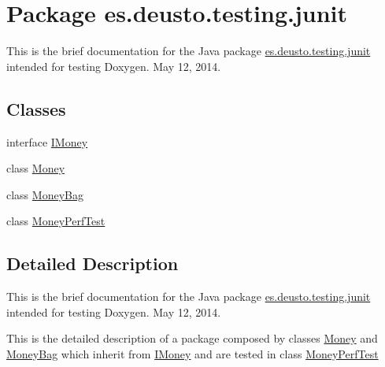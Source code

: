 \hypertarget{namespacees_1_1deusto_1_1testing_1_1junit}{}\section{Package es.\+deusto.\+testing.\+junit}
\label{namespacees_1_1deusto_1_1testing_1_1junit}


This is the brief documentation for the Java package \mbox{\hyperlink{namespacees_1_1deusto_1_1testing_1_1junit}{es.\+deusto.\+testing.\+junit}} intended for testing Doxygen. May 12, 2014.  


\subsection*{Classes}
\begin{DoxyCompactItemize}
\item 
interface \mbox{\hyperlink{interfacees_1_1deusto_1_1testing_1_1junit_1_1_i_money}{I\+Money}}
\item 
class \mbox{\hyperlink{classes_1_1deusto_1_1testing_1_1junit_1_1_money}{Money}}
\item 
class \mbox{\hyperlink{classes_1_1deusto_1_1testing_1_1junit_1_1_money_bag}{Money\+Bag}}
\item 
class \mbox{\hyperlink{classes_1_1deusto_1_1testing_1_1junit_1_1_money_perf_test}{Money\+Perf\+Test}}
\end{DoxyCompactItemize}


\subsection{Detailed Description}
This is the brief documentation for the Java package \mbox{\hyperlink{namespacees_1_1deusto_1_1testing_1_1junit}{es.\+deusto.\+testing.\+junit}} intended for testing Doxygen. May 12, 2014. 

This is the detailed description of a package composed by classes \mbox{\hyperlink{classes_1_1deusto_1_1testing_1_1junit_1_1_money}{Money}} and \mbox{\hyperlink{classes_1_1deusto_1_1testing_1_1junit_1_1_money_bag}{Money\+Bag}} which inherit from \mbox{\hyperlink{interfacees_1_1deusto_1_1testing_1_1junit_1_1_i_money}{I\+Money}} and are tested in class \mbox{\hyperlink{classes_1_1deusto_1_1testing_1_1junit_1_1_money_perf_test}{Money\+Perf\+Test}} 